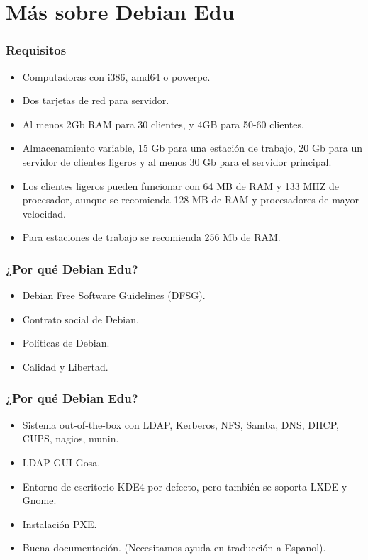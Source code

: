\documentclass{beamer}
\begin{document}
\section{M\'as sobre Debian Edu}
\begin{frame}
\frametitle{Requisitos}
\begin{itemize}
	\pause \item Computadoras con  i386, amd64 o powerpc.
	\pause \item Dos tarjetas de red para servidor.
	\pause \item Al menos 2Gb RAM para 30 clientes, y 4GB para 50-60 clientes.
	\pause \item Almacenamiento variable, 15 Gb para una estaci\'on de 
		trabajo, 20 Gb para un servidor de clientes ligeros y al 
		menos 30 Gb para el servidor principal.
	\pause \item Los clientes ligeros pueden funcionar con 64 MB de RAM y 
		133 MHZ de procesador, aunque se recomienda 128 MB de RAM y 
		procesadores de mayor velocidad.
	\pause \item Para estaciones de trabajo se recomienda 256 Mb de RAM.

\end{itemize}
\end{frame}

\begin{frame}
\frametitle{¿Por qu\'e Debian Edu?}
    \begin{itemize}
             \pause \item Debian Free Software Guidelines (DFSG).
	     \pause \item Contrato social de Debian.
	     \pause \item Pol\'iticas de Debian.
	     \pause \item Calidad y Libertad.
    \end{itemize}
\end{frame}

\begin{frame}
\frametitle{¿Por qu\'e Debian Edu?}
       \begin{itemize}
                \pause \item Sistema out-of-the-box con LDAP, Kerberos, NFS, Samba, DNS, DHCP, CUPS, nagios, munin.
                \pause \item LDAP GUI Gosa.
                \pause \item Entorno de escritorio KDE4 por defecto, pero tambi\'en se soporta LXDE y Gnome.
		\pause \item Instalaci\'on PXE.
		\pause \item Buena documentaci\'on. (Necesitamos ayuda en traducci\'on a Espanol).
        \end{itemize}
\end{frame}
\end{document}
